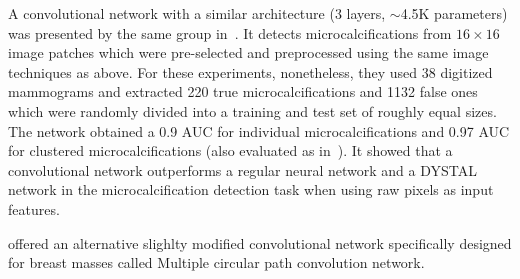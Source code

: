 \begin{comment} Lo 1998
- similar to Lo 1995:
	detect microcalcifications
	pre-selected image patches
	8 rotations per image(0,90,180,270 and flipped)
	sigmoid activation function
	16 by 16 pixel size
	5 by 5 filters
	2 outputs
	clustering method
- only 10 groups per layer
- "Typically, the sizes of microcalcifications vary from 0.16 mm to 1.0 mm."
- each pixel 0.1mm, more than that may make dissapear the microcalc.
- DYSTAL network, regular neural network, and convolutional network. convnet ouptperforms them.
- rotation and translation invariance.
- gaussian-like activation function in input (?)
- 38 "digital" mammograms: 220 true and 1132 subtle microcalcififcations
- divided into two roughly equal sets for test (no cross validation)
- 0.9 AUC for microcalc and 0.97 AUC for clustered microcalcif
\end{comment}
A convolutional network with a similar architecture (3 layers, $\sim$4.5K parameters) was presented by the same group in~\cite{Lo1998}. It detects microcalcifications from $16 \times 16$ image patches which were pre-selected and preprocessed using the same image techniques as above. For these experiments, nonetheless, they used 38 digitized mammograms and extracted 220 true microcalcifications and 1132 false ones which were randomly divided into a training and test set of roughly equal sizes. The network obtained a 0.9 AUC for individual microcalcifications and 0.97 AUC for clustered microcalcifications (also evaluated as in~\cite{Lo1995}). It showed that a convolutional network outperforms a regular neural network and a DYSTAL network in the microcalcification detection task when using raw pixels as input features.





\begin{comment} Lo2002
. 
\end{comment}
\cite{Lo2002} offered an alternative slighlty modified convolutional network specifically designed for breast masses called Multiple circular path convolution network.

